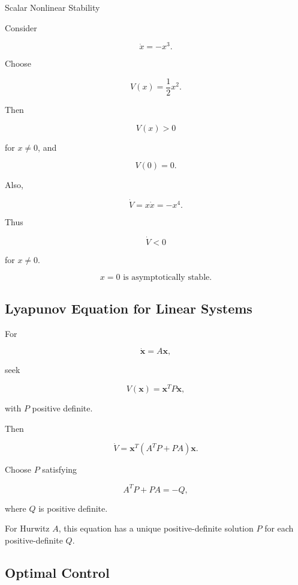 \begin{workedexamplebox}{Scalar Nonlinear Stability}

Consider

\[
\dot{x}
=
-x^3.
\]

Choose

\[
V(x)
=
\frac12x^2.
\]

Then

\[
V(x)>0
\]

for \(x\neq0\), and

\[
V(0)=0.
\]

Also,

\[
\dot V
=
x\dot{x}
=
-x^4.
\]

Thus

\[
\dot V<0
\]

for \(x\neq0\).

\begin{answerbox}
\[
\boxed{
x=0
\text{ is asymptotically stable}.
}
\]
\end{answerbox}

\end{workedexamplebox}

\subsection{Lyapunov Equation for Linear Systems}
\label{subsec:linear-lyapunov-equation}

For

\[
\dot{\mathbf{x}}
=
A\mathbf{x},
\]

seek

\[
\boxed{
V(\mathbf{x})
=
\mathbf{x}^{T}P\mathbf{x},
}
\]

with \(P\) positive definite.

Then

\[
\dot V
=
\mathbf{x}^{T}
(A^TP+PA)
\mathbf{x}.
\]

Choose \(P\) satisfying

\[
\boxed{
A^TP+PA
=
-Q,
}
\]

where \(Q\) is positive definite.

For Hurwitz \(A\), this equation has a unique positive-definite solution
\(P\) for each positive-definite \(Q\).

\subsection{Optimal Control}
\label{subsec:control-optimal-control}


